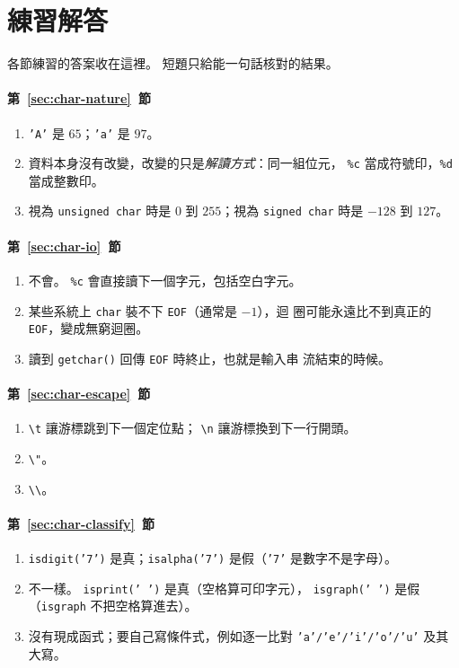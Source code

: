 \section*{練習解答}

各節練習的答案收在這裡。 短題只給能一句話核對的結果。

\paragraph{第~\ref{sec:char-nature}~節}
\begin{enumerate}
\item \texttt{'A'} 是 $65$；\texttt{'a'} 是 $97$。
\item 資料本身沒有改變，改變的只是\emph{解讀方式}：同一組位元，
\texttt{\%c} 當成符號印，\texttt{\%d} 當成整數印。
\item 視為 \texttt{unsigned char} 時是 $0$ 到 $255$；視為
\texttt{signed char} 時是 $-128$ 到 $127$。
\end{enumerate}

\paragraph{第~\ref{sec:char-io}~節}
\begin{enumerate}
\item 不會。 \texttt{\%c} 會直接讀下一個字元，包括空白字元。
\item 某些系統上 \texttt{char} 裝不下 \texttt{EOF}（通常是 $-1$），迴
圈可能永遠比不到真正的 \texttt{EOF}，變成無窮迴圈。
\item 讀到 \texttt{getchar()} 回傳 \texttt{EOF} 時終止，也就是輸入串
流結束的時候。
\end{enumerate}

\paragraph{第~\ref{sec:char-escape}~節}
\begin{enumerate}
\item \texttt{\textbackslash t} 讓游標跳到下一個定位點；
\texttt{\textbackslash n} 讓游標換到下一行開頭。
\item \texttt{\textbackslash"}。
\item \texttt{\textbackslash\textbackslash}。
\end{enumerate}

\paragraph{第~\ref{sec:char-classify}~節}
\begin{enumerate}
\item \texttt{isdigit('7')} 是真；\texttt{isalpha('7')} 是假（\texttt{'7'}
是數字不是字母）。
\item 不一樣。 \texttt{isprint(' ')} 是真（空格算可印字元），
\texttt{isgraph(' ')} 是假（\texttt{isgraph} 不把空格算進去）。
\item 沒有現成函式；要自己寫條件式，例如逐一比對
\texttt{'a'/'e'/'i'/'o'/'u'} 及其大寫。
\end{enumerate}

